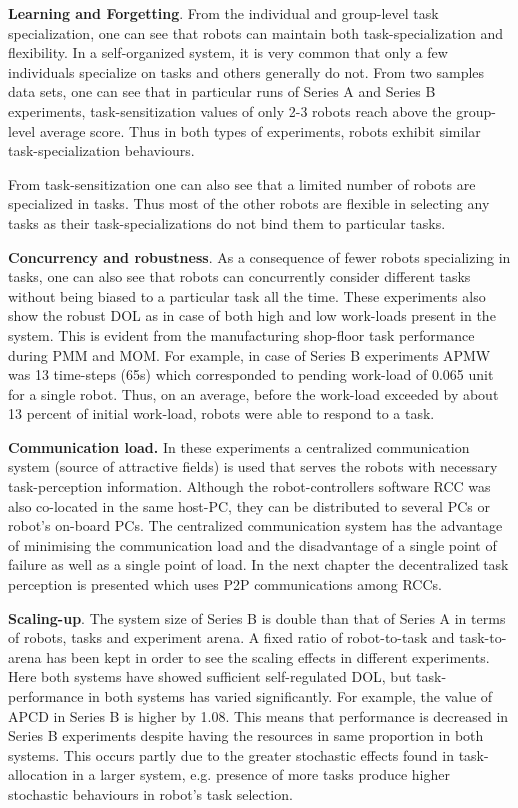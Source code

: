 \textbf{Learning and Forgetting}. From the individual and group-level task specialization, one can see that robots can maintain both task-specialization and flexibility. In a self-organized system, it is very common that only a few individuals specialize on tasks and others generally do not. From two samples data sets, one can see that in particular runs of Series A and Series B experiments, task-sensitization values of  only 2-3 robots reach above the group-level average score. Thus in both types of experiments, robots exhibit similar task-specialization behaviours. 

From task-sensitization one can also see that a limited number of robots are specialized in tasks. Thus most of the other robots are flexible in selecting any tasks as their task-specializations do not bind them to particular tasks.

\textbf{Concurrency and robustness}. As a consequence of fewer robots specializing in tasks, one can also see that robots can concurrently  consider different tasks without being biased to a particular task all the time. These experiments also show the robust DOL as in case of  both high and low work-loads present in the system. This is evident from the manufacturing shop-floor task performance during PMM and MOM. For example,  in case of Series B experiments APMW was 13 time-steps (65s) which corresponded  to pending work-load of 0.065 unit for a single robot. Thus, on an average, before the work-load exceeded by about 13 percent of initial work-load, robots were able to respond to  a task.

\textbf{Communication load.} In these experiments  a centralized communication system (source of attractive fields) is used that serves the robots with necessary task-perception information. Although the robot-controllers software RCC was also co-located in the same host-PC, they can be distributed to several PCs or robot's on-board PCs. The centralized communication system has the advantage of minimising the communication load and the disadvantage of a single point of failure as well as a single point of load. In the next chapter the decentralized task perception is presented which uses P2P communications among RCCs.

\textbf{Scaling-up}. The system size of Series B is double than that of Series A in terms of robots, tasks and experiment arena.  A fixed ratio of robot-to-task and task-to-arena has been kept in order to see the scaling effects in different experiments. Here both systems have showed sufficient self-regulated DOL, but task-performance in both systems has varied significantly. For example, the value of APCD in Series B is higher by 1.08. This means that performance  is decreased in Series B experiments despite having the resources in same proportion in both systems. This occurs partly due to the greater stochastic effects found in task-allocation in a larger system, e.g. presence of more tasks produce higher stochastic behaviours in robot's task selection.


